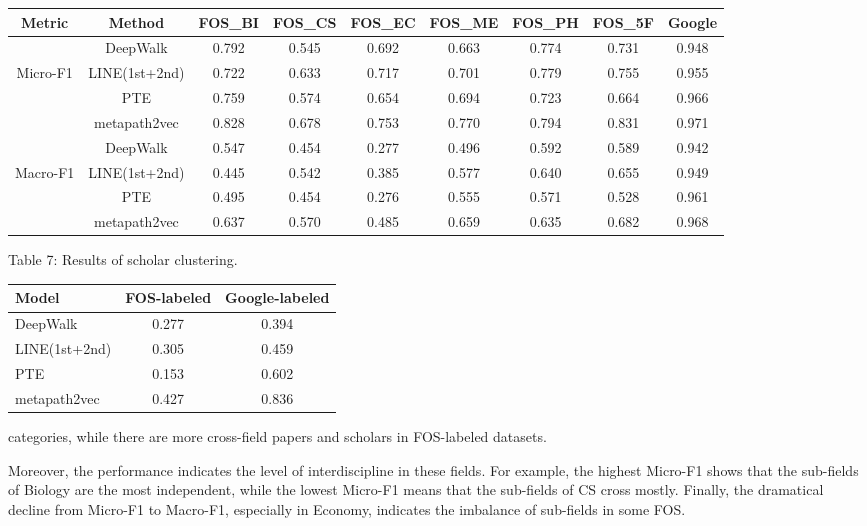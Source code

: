 \documentclass[10pt]{article}
\begin{document}
\begin{center}
\begin{tabular}{c|cccccccc}
\hline
Metric & Method & FOS\_BI & FOS\_CS & FOS\_EC & FOS\_ME & FOS\_PH & FOS\_5F & Google \\
\hline
 & DeepWalk & 0.792 & 0.545 & 0.692 & 0.663 & 0.774 & 0.731 & 0.948 \\
Micro-F1 & LINE(1st+2nd) & 0.722 & 0.633 & 0.717 & 0.701 & 0.779 & 0.755 & 0.955 \\
 & PTE & 0.759 & 0.574 & 0.654 & 0.694 & 0.723 & 0.664 & 0.966 \\
 & metapath2vec & 0.828 & 0.678 & 0.753 & 0.770 & 0.794 & 0.831 & 0.971 \\
\hline
 & DeepWalk & 0.547 & 0.454 & 0.277 & 0.496 & 0.592 & 0.589 & 0.942 \\
Macro-F1 & LINE(1st+2nd) & 0.445 & 0.542 & 0.385 & 0.577 & 0.640 & 0.655 & 0.949 \\
 & PTE & 0.495 & 0.454 & 0.276 & 0.555 & 0.571 & 0.528 & 0.961 \\
 & metapath2vec & 0.637 & 0.570 & 0.485 & 0.659 & 0.635 & 0.682 & 0.968 \\
\hline
\end{tabular}
\end{center}

Table 7: Results of scholar clustering.

\begin{center}
\begin{tabular}{l|cc}
\hline
Model & FOS-labeled & Google-labeled \\
\hline
DeepWalk & 0.277 & 0.394 \\
LINE(1st+2nd) & 0.305 & 0.459 \\
PTE & 0.153 & 0.602 \\
metapath2vec & 0.427 & 0.836 \\
\hline
\end{tabular}
\end{center}

categories, while there are more cross-field papers and scholars in FOS-labeled datasets.

Moreover, the performance indicates the level of interdiscipline in these fields. For example, the highest Micro-F1 shows that the sub-fields of Biology are the most independent, while the lowest Micro-F1 means that the sub-fields of CS cross mostly. Finally, the dramatical decline from Micro-F1 to Macro-F1, especially in Economy, indicates the imbalance of sub-fields in some FOS.
\end{document}
